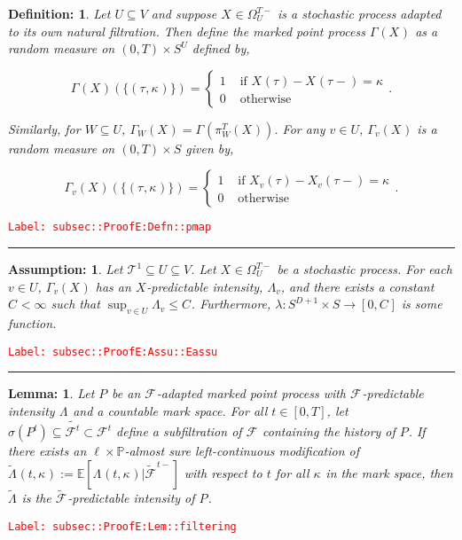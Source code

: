 \documentclass[12pt]{article}
\newcommand{\mb}{\mathbb}
\newcommand{\mc}{\mathcal}
\newcommand{\ra}{\rightarrow}
\newcommand{\te}{\text}
\newcommand{\tr}{\textcolor{red}}
\newcommand{\labe}[1]{\tr{\texttt{Label: #1}}}
\newcommand{\lin}{\rule{\linewidth}{0.4 pt}}
\newcommand{\pr}{\mb{P}}							%
\newcommand{\ex}[1]{\mb{E}\left[#1\right]}			%
\renewcommand{\v}{v}							%
\renewcommand{\U}{U}							%
\newcommand{\UU}{W}								%
\renewcommand{\S}{S}							%
\newcommand{\T}{T}								%
\newcommand{\OmegaV}[2]{\Omega_{#1}^{#2}}		%
\renewcommand{\t}{t}							%
\newcommand{\degr}{D}								%
\newcommand{\pup}[1]{^{#1}}							%
\newcommand{\tree}{\mc{T}}							%
\newcommand{\V}{V}									%
\newcommand{\rt}[1]{\tau^{#1}}						%
\newcommand{\piV}[2]{\pi_{#1}^{#2}}					%
\newcommand{\rxvt}[2]{X_{#1}{(#2)}}					%
\newcommand{\rxvts}[2]{X_{#1}{#2}}					%
\newcommand{\rp}[1]{P^{#1}}							%
\newcommand{\ratee}[1]{\Lambda_{#1}}				%
\newcommand{\cratee}[2]{\alt{\Lambda}_{#1}^{#2}} 	%
\newcommand{\F}[2]{\mc{F}_{#1}^{#2}}				%
\newcommand{\const}[1]{C_{#1}}						%
\newcommand{\Sm}{\ell}								%
\newcommand{\alt}{\widetilde}						%
\renewcommand{\mark}[1]{\kappa^{#1}}				%
\newcommand{\pmap}[1]{\Gamma_{#1}}				%
\newtheorem{lem}[thms]{Lemma: }
\newtheorem{defn}[thms]{Definition: }
\newtheorem{assu}[thms]{Assumption: }
\begin{document}
\begin{defn}
Let \(\U\subseteq \V\) and suppose \(\rxvts{}{} \in \OmegaV{\U}{\T-}\) is a stochastic process adapted to its own natural filtration. Then define the marked point process \(\pmap{}(\rxvts{}{})\) as a random measure on \((0,\T) \times \S^\U\) defined by,

\[\pmap{}(\rxvts{}{})(\{(\rt{},\mark{})\}) = \begin{cases}
1 &\te{ if } \rxvt{}{\rt{}} - \rxvt{}{\rt{}-} = \mark{}\\
0 &\te{ otherwise}
\end{cases}.\]

Similarly, for \(\UU \subseteq \U\), \(\pmap{\UU}(\rxvts{}{}) = \pmap{}\left(\piV{\UU}{\T}(\rxvts{}{})\right)\). For any \(\v\in \U\), \(\pmap{\v}(\rxvts{}{})\) is a random measure on \((0,\T) \times \S\) given by,

\[\pmap{\v}(\rxvts{}{})(\{(\rt{},\mark{})\}) = \begin{cases}
1 &\te{ if } \rxvt{\v}{\rt{}} - \rxvt{\v}{\rt{}-} = \mark{}\\
0 &\te{ otherwise}
\end{cases}.\]
\label{subsec::ProofE:Defn::pmap}
\end{defn}
\labe{subsec::ProofE:Defn::pmap}

\lin

\begin{assu}
Let \(\tree\pup{1}\subseteq\U \subseteq \V\). Let \(\rxvts{}{}\in \OmegaV{\U}{\T-}\) be a stochastic process. For each \(\v\in \U\), \(\pmap{\v}(\rxvts{}{})\) has an \(\rxvts{}{}\)-predictable intensity, \(\ratee{\v}\), and there exists a constant \(\const{} < \infty\) such that \(\sup_{\v\in\U} \ratee{\v} \leq \const{}\). Furthermore, \(\lambda: \S^{\degr+1}\times \S\ra[0,\const{}]\) is some function.
\label{subsec::ProofE:Assu::Eassu}
\end{assu}
\labe{subsec::ProofE:Assu::Eassu}

\lin

\begin{lem}
Let \(\rp{}\) be an \(\F{}{}\)-adapted marked point process with \(\F{}{}\)-predictable intensity \(\ratee{}\) and a countable mark space. For all \(\t \in [0,\T]\), let \(\sigma(\rp{\t}) \subseteq \alt{\F{}{\t}}\subset \F{}{\t}\) define a subfiltration of \(\F{}{}\) containing the history of \(\rp{}\). If there exists an \(\Sm\times \pr\)-almost sure left-continuous modification of \(\cratee{}{}(\t,\mark{}) := \ex{\ratee{}(\t,\mark{})|\alt{\F{}{}}^{\t-}}\) with respect to \(\t\) for all \(\mark{}\) in the mark space, then \(\cratee{}{}\) is the \(\alt{\F{}{}}\)-predictable intensity of \(\rp{}\).
\label{subsec::ProofE:Lem::filtering}
\end{lem}
\labe{subsec::ProofE:Lem::filtering}
\end{document}
